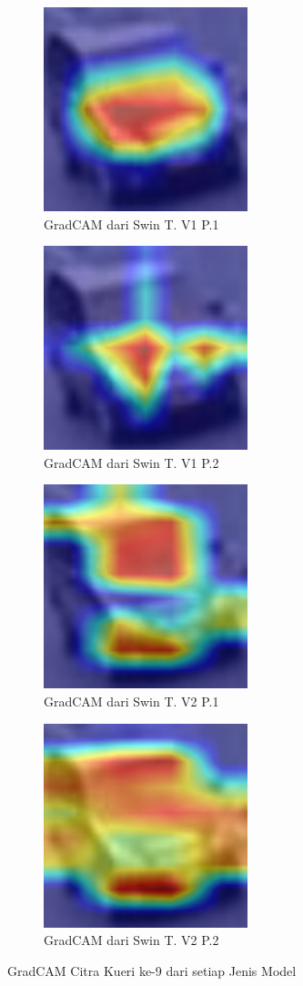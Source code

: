 \begin{figure}[h!]
  \centering
  \begin{subfigure}{.4\textwidth}
    \centering
    \includegraphics[width=.3\linewidth]{gambar/Que9_GradCAMV1P1IT3.jpg}
    \caption{GradCAM dari Swin T. V1 P.1}
    \label{gradcamkuerinomorsembilanV1P1}
  \end{subfigure}%
  \begin{subfigure}{.4\textwidth}
    \centering
    \includegraphics[width=.3\linewidth]{gambar/Que9_gradCAMV1P2IT2.jpg}
    \caption{GradCAM dari Swin T. V1 P.2}
    \label{gradcamkuerinomorsembilanV1P2}
  \end{subfigure}
  \begin{subfigure}{.4\textwidth}
    \centering
    \includegraphics[width=.3\linewidth]{gambar/Que9_V2P1IT1.png}
    \caption{GradCAM dari Swin T. V2 P.1}
    \label{gradcamkuerinomorsembilanV2P1}
  \end{subfigure}
  \begin{subfigure}{.4\textwidth}
    \centering
    \includegraphics[width=.3\linewidth]{gambar/Que9_V2P2IT3.png}
    \caption{GradCAM dari Swin T. V2 P.2}
    \label{gradcamkuerinomorsembilanV2P2}
  \end{subfigure}
  \caption{GradCAM Citra Kueri ke-9 dari setiap Jenis Model}
  \label{fig:gradcamdarisetiapjenismodelpengujiankelima}
\end{figure}

